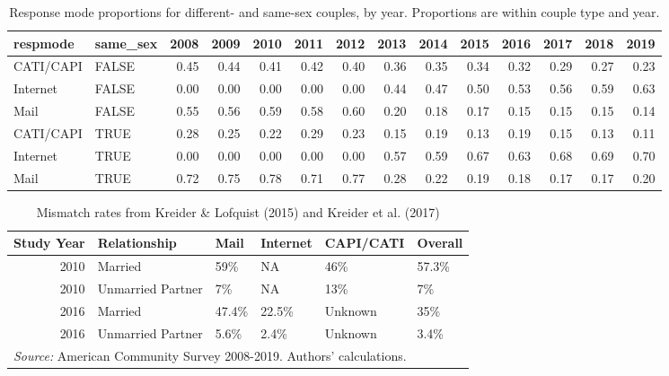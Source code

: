\documentclass[
  11pt,
]{article}
\begin{document}
\begin{table}

\caption{\label{tab:respmode}Response mode proportions for different- and same-sex couples, by year. Proportions are within couple type and year.}
\centering
\fontsize{9}{11}\selectfont
\begin{tabular}[t]{llrrrrrrrrrrrr}
\toprule
respmode & same\_sex & 2008 & 2009 & 2010 & 2011 & 2012 & 2013 & 2014 & 2015 & 2016 & 2017 & 2018 & 2019\\
\midrule
CATI/CAPI & FALSE & 0.45 & 0.44 & 0.41 & 0.42 & 0.40 & 0.36 & 0.35 & 0.34 & 0.32 & 0.29 & 0.27 & 0.23\\
Internet & FALSE & 0.00 & 0.00 & 0.00 & 0.00 & 0.00 & 0.44 & 0.47 & 0.50 & 0.53 & 0.56 & 0.59 & 0.63\\
Mail & FALSE & 0.55 & 0.56 & 0.59 & 0.58 & 0.60 & 0.20 & 0.18 & 0.17 & 0.15 & 0.15 & 0.15 & 0.14\\
CATI/CAPI & TRUE & 0.28 & 0.25 & 0.22 & 0.29 & 0.23 & 0.15 & 0.19 & 0.13 & 0.19 & 0.15 & 0.13 & 0.11\\
Internet & TRUE & 0.00 & 0.00 & 0.00 & 0.00 & 0.00 & 0.57 & 0.59 & 0.67 & 0.63 & 0.68 & 0.69 & 0.70\\
\addlinespace
Mail & TRUE & 0.72 & 0.75 & 0.78 & 0.71 & 0.77 & 0.28 & 0.22 & 0.19 & 0.18 & 0.17 & 0.17 & 0.20\\
\bottomrule
\end{tabular}
\end{table}

\begin{table}

\caption{\label{tab:mismatch}Mismatch rates from Kreider \& Lofquist (2015) and Kreider et al. (2017)}
\centering
\begin{tabular}[t]{rlllll}
\toprule
Study Year & Relationship & Mail & Internet & CAPI/CATI & Overall\\
\midrule
2010 & Married & 59\% & NA & 46\% & 57.3\%\\
2010 & Unmarried Partner & 7\% & NA & 13\% & 7\%\\
2016 & Married & 47.4\% & 22.5\% & Unknown & 35\%\\
2016 & Unmarried Partner & 5.6\% & 2.4\% & Unknown & 3.4\%\\
\bottomrule
\multicolumn{6}{l}{\rule{0pt}{1em}\textit{Source:} American Community Survey 2008-2019. Authors' calculations.}\\
\end{tabular}
\end{table}
\end{document}
